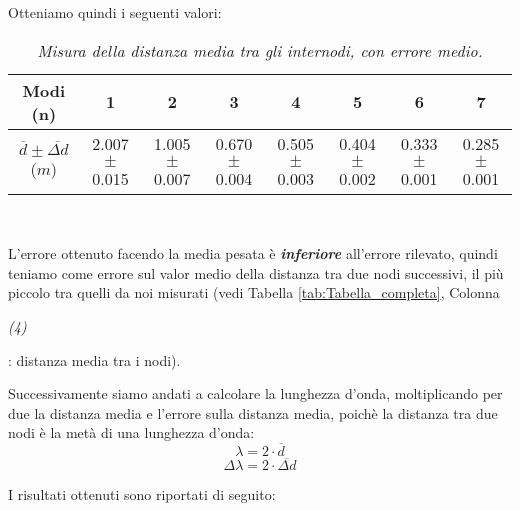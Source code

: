 \documentclass[12pt, a4paper]{article}
\begin{document}
\addvspace{1.5cm}
Otteniamo quindi i seguenti valori:
{
\renewcommand\arraystretch{1.2} %

\begin{table}[ht] %


\begin{tabular}{|c|c|c|c|c|c|c|c|} 
 
 \hline
  \small Modi (n) & 1 & 2 & 3 & 4 & 5 & 6 & 7\\
  
\hline

  
  \small $\overline{d}\pm\overline{\Delta{d}}$ ($m$) &\footnotesize{2.007$\pm$0.015}  &\footnotesize{1.005$\pm$0.007} &\footnotesize{0.670$\pm$0.004}&\footnotesize{0.505$\pm$0.003}&\footnotesize{0.404$\pm$0.002} &\footnotesize{0.333$\pm$0.001}&\footnotesize{0.285$\pm$0.001}\\
\hline


\end{tabular}\\
\caption{\small{\textit{Misura della distanza media tra gli internodi, con errore medio.} }}
    \label{tab:Error_MediapesataFalse}
\end{table}
}
L'errore ottenuto facendo la media pesata è \textbf{\textit{inferiore}} all'errore rilevato, quindi teniamo come errore sul valor medio della distanza tra due nodi successivi, il più piccolo tra quelli da noi misurati (vedi Tabella \ref{tab:Tabella_completa}, Colonna \begin{footnotesize}{\textit{(4)}}\end{footnotesize}: distanza media tra i nodi).




Successivamente siamo andati a calcolare la lunghezza d'onda, moltiplicando per due la distanza media e l'errore sulla distanza media, poichè la distanza tra due nodi è la metà di una lunghezza d'onda:
\begin{equation*}
    \lambda=2\cdot\overline{d}
\end{equation*}
\begin{equation*}
    \Delta\lambda=2\cdot\overline{\Delta{d}}
\end{equation*}

\addvspace{1.5cm}
 I risultati ottenuti sono riportati di seguito: 
 
\end{document}
